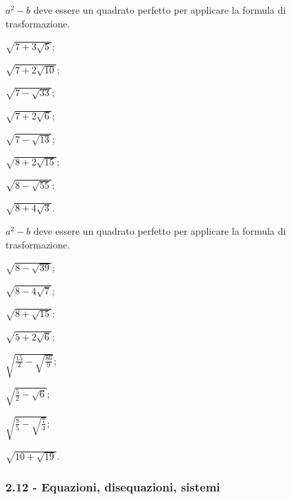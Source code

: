 \begin{esercizio}[\Ast]
 \label{ese:2.78}
$a^2-b$ deve essere un quadrato perfetto per applicare la formula di trasformazione.
 \begin{multicols}{4}
 \begin{enumeratea}
 \item $\sqrt{7+3\sqrt 5}$;
 \item $\sqrt{7+2\sqrt{10}}$;
 \item $\sqrt{7-\sqrt{33}}$;
 \item $\sqrt{7+2\sqrt 6}$;
 \item $\sqrt{7-\sqrt{13}}$;
 \item $\sqrt{8+2\sqrt{15}}$;
 \item $\sqrt{8-\sqrt{55}}$;
 \item $\sqrt{8+4\sqrt 3}$.
 \end{enumeratea}
 \end{multicols}
\end{esercizio}
\newpage
\begin{esercizio}
 \label{ese:2.79}
$a^2-b$ deve essere un quadrato perfetto per applicare la formula di trasformazione.
 \begin{multicols}{4}
 \begin{enumeratea}
 \item $\sqrt{8-\sqrt{39}}$;
 \item $\sqrt{8-4\sqrt 7}$;
 \item $\sqrt{8+\sqrt{15}}$;
 \item $\sqrt{5+2\sqrt 6}$;
 \item $\sqrt{\frac{15} 2-\sqrt{\frac{86} 9}}$;
 \item $\sqrt{\frac 5 2-\sqrt 6}$;
 \item $\sqrt{\frac 8 5-\sqrt{\frac 7 4}}$;
 \item $\sqrt{10+\sqrt{19}}$.
 \end{enumeratea}
 \end{multicols}
\end{esercizio}

\subsubsection*{2.12 - Equazioni, disequazioni, sistemi}

